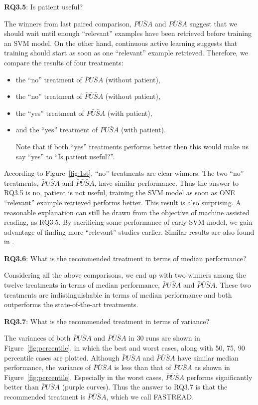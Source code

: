 \documentclass[final,twocolumn,5p]{elsarticle}
\theoremstyle{break}
\begin{document}
\textbf{RQ3.5}: Is patient useful?

The winners from last paired comparison, $PU\bar{S}A$ and $P\bar{U}\bar{S}A$ suggest that we should wait until enough ``relevant'' examples have been retrieved before training an SVM model. On the other hand, continuous active learning suggests that training should start as soon as
one ``relevant'' example retrieved. Therefore, we compare the results of four treatments:

\begin{itemize}
\item the ``no'' treatment of $\bar{P}U\bar{S}A$ (without patient),
\item the ``no'' treatment of $\bar{P}\bar{U}\bar{S}A$ (without patient),
\item the ``yes'' treatment of $P\bar{U}\bar{S}A$ (with patient), 
\item and the ``yes'' treatment of $PU\bar{S}A$ (with patient). 

Note that if both ``yes'' treatments performs better then this would make us say ``yes'' to ``Is patient useful?''.
\end{itemize}

According to Figure~\ref{fig:1st}, ``no'' treatments are clear winners. The two ``no'' treatments, $\bar{P}U\bar{S}A$ and $\bar{P}\bar{U}\bar{S}A$, have similar performance. Thus the answer to RQ3.5 is no, patient is not useful, training the SVM model as soon as ONE ``relevant'' example retrieved performs better. This result is also surprising. A reasonable explanation can still be drawn from the objective of machine assisted reading, as RQ3.5. By sacrificing some performance of early SVM model, we gain advantage of finding more ``relevant'' studies earlier. Similar results are also found in \cite{cormack2014evaluation}.

\textbf{RQ3.6}: What is the recommended treatment in terms of median performance?

Considering all the above comparisons, we end up with two winners among the twelve treatments in terms of median performance, $\bar{P}U\bar{S}A$ and $\bar{P}\bar{U}\bar{S}A$. These two treatments are indistinguishable in terms of median performance and both outperforms the state-of-the-art treatments.

\textbf{RQ3.7}: What is the recommended treatment in terms of variance?

The variances of both $\bar{P}U\bar{S}A$ and $\bar{P}\bar{U}\bar{S}A$ in $30$ runs are shown in Figure~\ref{fig:percentile}, in which the best and worst cases, along with 50, 75, 90 percentile cases are plotted. Although $\bar{P}U\bar{S}A$ and $\bar{P}\bar{U}\bar{S}A$ have similar median performance, the variance of $\bar{P}\bar{U}\bar{S}A$ is less than that of $\bar{P}U\bar{S}A$ as shown in Figure~\ref{fig:percentile}. Especially in the worst cases, $\bar{P}\bar{U}\bar{S}A$ performs significantly better than $\bar{P}U\bar{S}A$ (purple curves). Thus the answer to RQ3.7 is that the recommended treatment is $\bar{P}\bar{U}\bar{S}A$, which we call FASTREAD.
\end{document}
